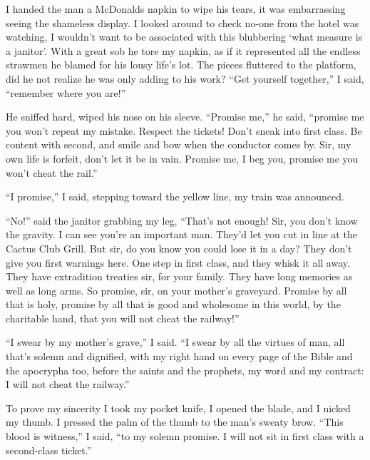 \documentclass[oneside]{book}
\begin{document}
I handed the man a McDonalds napkin to wipe his tears, it was embarrassing seeing the shameless display.  I looked
around to check no-one from the hotel was watching, I wouldn't want to be associated
with this blubbering `what measure is a janitor'.  With a great sob he tore my napkin, as if it represented all the endless strawmen
he blamed for his lousy life's lot.  The pieces fluttered to the platform, did he not realize he was only
adding to his work?  ``Get yourself together,'' I said, ``remember where you are!''

He sniffed hard, wiped his nose on his sleeve.  ``Promise me,'' he said, ``promise me you won't repeat
my mistake.  Respect the tickets!  Don't sneak into first class.  Be content with second, and smile and
bow when the conductor comes by.  Sir, my own life is forfeit, don't let it be in vain.  Promise me, I beg you,
promise me you won't cheat the rail.''

``I promise,'' I said, stepping toward the yellow line, my train was announced.

``No!'' said the janitor grabbing my leg, ``That's not enough!  Sir, you don't know the gravity.
I can see you're an important man.  They'd let you cut in line at the Cactus Club Grill.  But sir,
do you know you could lose it in a day?  They don't give you first warnings here.  One step in
first class, and they whisk it all away.  They have extradition treaties sir, for your family.
They have long memories as well as long arms.
So promise, sir, on your mother's graveyard.  Promise by all that is holy, promise by all that is good and wholesome in
this world, by the charitable hand,
that you will not cheat the railway!''

``I swear by my mother's grave,'' I said.  ``I swear by all the virtues of man,
all that's solemn
and dignified, with my right hand on every page of the Bible and the apocrypha too,
before the saints and the prophets, my word and my contract: I will not cheat the railway.''

To prove my sincerity I took my pocket knife, I opened the blade, and I nicked
my thumb.  I pressed the palm of the thumb to the man's sweaty brow.  ``This blood is witness,'' I said, ``to my
solemn promise.  I will not sit in first class with a second-class ticket.''
\end{document}
